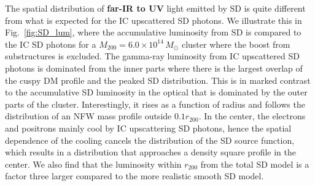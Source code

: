 \documentclass[10pt,aps,pra,reprint,amsmath,amsfonts,amssymb,showpacs,nofootinbib,floatfix]{revtex4-1}
\def\C#1{{\bf #1}}
\newcommand{\msun}{M_\odot}
\newcommand{\rvir}{r_{200}}
\newcommand{\mvir}{M_{200}}
\begin{document}
The spatial distribution of \C{far-IR to UV} light emitted by SD
is quite different from what is expected for the IC upscattered SD
photons. We illustrate this in Fig.~\ref{fig:SD_lum}, where the
accumulative luminosity from SD is compared to the IC SD photons for a
$\mvir=6.0\times10^{14}\,\msun$ cluster where the boost from
substructures is excluded. The gamma-ray luminosity from IC
upscattered SD photons is dominated from the inner parts where there
is the largest overlap of the cuspy DM profile and the peaked SD
distribution. This is in marked contrast to the accumulative SD
luminosity in the optical that is dominated by the outer parts of the
cluster. Interestingly, it rises as a function of radius and follows
the distribution of an NFW mass profile outside $0.1\rvir$. In the
center, the electrons and positrons mainly cool by IC upscattering SD
photons, hence the spatial dependence of the cooling cancels the
distribution of the SD source function, which results in a
distribution that approaches a density square profile in the center.
We also find that the luminosity within $\rvir$ from the total SD
model is a factor three larger compared to the more realistic smooth
SD model.
\end{document}

